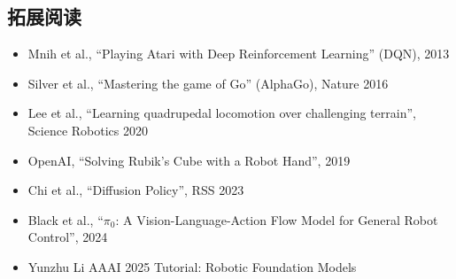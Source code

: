 \subsection{拓展阅读}

\begin{itemize}
    \item Mnih et al., ``Playing Atari with Deep Reinforcement Learning'' (DQN), 2013
    \item Silver et al., ``Mastering the game of Go'' (AlphaGo), Nature 2016
    \item Lee et al., ``Learning quadrupedal locomotion over challenging terrain'', Science Robotics 2020
    \item OpenAI, ``Solving Rubik's Cube with a Robot Hand'', 2019
    \item Chi et al., ``Diffusion Policy'', RSS 2023
    \item Black et al., ``$\pi_0$: A Vision-Language-Action Flow Model for General Robot Control'', 2024
    \item Yunzhu Li AAAI 2025 Tutorial: Robotic Foundation Models
\end{itemize}


